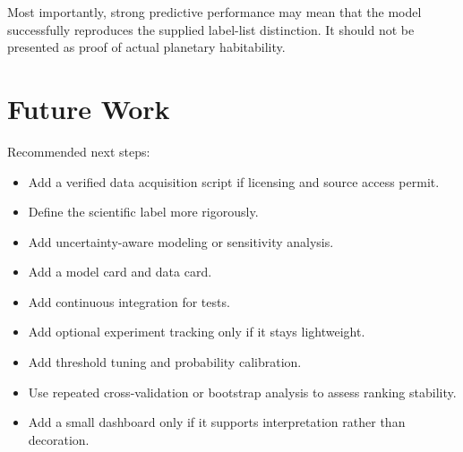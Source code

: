 \documentclass[11pt]{article}
\begin{document}
Most importantly, strong predictive performance may mean that the model successfully reproduces the supplied label-list distinction. It should not be presented as proof of actual planetary habitability.

\section{Future Work}

Recommended next steps:

\begin{itemize}
  \item Add a verified data acquisition script if licensing and source access permit.
  \item Define the scientific label more rigorously.
  \item Add uncertainty-aware modeling or sensitivity analysis.
  \item Add a model card and data card.
  \item Add continuous integration for tests.
  \item Add optional experiment tracking only if it stays lightweight.
  \item Add threshold tuning and probability calibration.
  \item Use repeated cross-validation or bootstrap analysis to assess ranking stability.
  \item Add a small dashboard only if it supports interpretation rather than decoration.
\end{itemize}

\newpage


\end{document}
